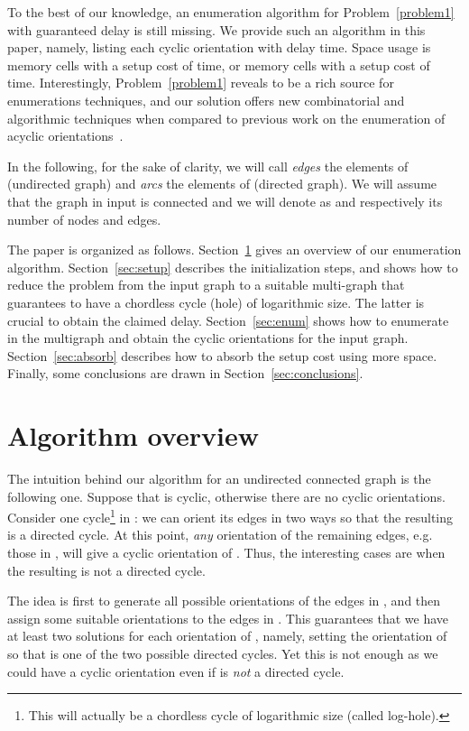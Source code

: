 \documentclass{llncs}
\newcommand{\loghole}{log-hole\xspace}
\begin{document}
To the best of our knowledge, an enumeration algorithm for
Problem~\ref{problem1} with guaranteed  delay is still
missing. We provide such an algorithm in this paper, namely, listing
each cyclic orientation with  delay time. Space usage is
 memory cells with a setup cost of  time, or 
memory cells with a setup cost of  time. Interestingly, 
Problem~\ref{problem1} reveals to be a rich source for enumerations techniques, and our solution
offers new combinatorial and algorithmic techniques when compared to
previous work on the enumeration of acyclic
orientations~\cite{Barbosa199971,Squire1998275}.

In the following, for the sake of clarity, we will call \emph{edges}
the elements of  (undirected graph) and \emph{arcs} the elements of
 (directed graph).  We will assume that the graph in input
 is connected and we will denote as  and 
respectively its number of nodes and edges.

The paper is organized as follows. Section~\ref{sec:overview}
 gives an overview of our enumeration algorithm. Section~\ref{sec:setup} describes the initialization steps, and shows how to reduce the problem from the input graph to a suitable multi-graph that guarantees to have a chordless cycle (hole) of logarithmic size. The latter is crucial to obtain the claimed delay.
Section~\ref{sec:enum} shows how to enumerate in the multigraph and obtain the cyclic orientations for the input graph. Section~\ref{sec:absorb} describes how to absorb the setup cost using more space. Finally, some conclusions are drawn in Section~\ref{sec:conclusions}.



\section{Algorithm overview}
\label{sec:overview}

The intuition behind our algorithm for an undirected connected graph  is the following one. Suppose that  is cyclic, otherwise there are no cyclic orientations. Consider one cycle\footnote{This will actually be a chordless cycle of logarithmic size (called \loghole).}  in : we can orient its edges in two ways so that the resulting  is a directed cycle. At this point, \emph{any} orientation of the remaining edges, e.g. those in , will give a cyclic orientation of . Thus, the interesting cases are when the resulting  is not a directed cycle. 

The idea is first to generate all possible orientations of the edges in , and then assign some suitable orientations to the edges in . This guarantees that we have at least two solutions for each orientation of , namely, setting the orientation of  so that  is one of the two possible directed cycles. Yet this is not enough as we could have a cyclic orientation even if  is \emph{not} a directed cycle. 
\end{document}
